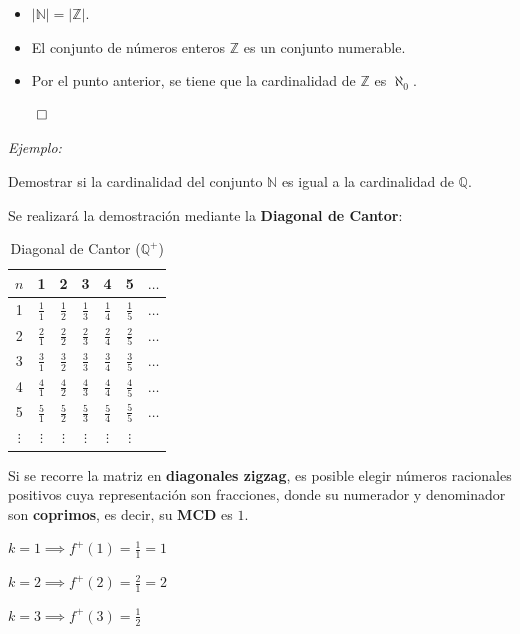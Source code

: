 \documentclass{article}
\begin{document}
\begin{itemize}
    \item $\left|\mathbb{N}\right| = \left|\mathbb{Z}\right|$.
    \item El conjunto de números enteros $\mathbb{Z}$ es un conjunto numerable.
    \item Por el punto anterior, se tiene que la cardinalidad de $\mathbb{Z}$ es $\aleph_0$.
\end{itemize}

$\qed$

\textit{Ejemplo:}

Demostrar si la cardinalidad del conjunto $\mathbb{N}$ es igual a la cardinalidad de $\mathbb{Q}$.

Se realizará la demostración mediante la \textbf{Diagonal de Cantor}:

\begin{table}[H]
\centering
\renewcommand{\arraystretch}{1.5}
\begin{tabular}{c|cccccc}
$n$ & 1 & 2 & 3 & 4 & 5 & $\dots$ \\ \hline
1 & \color{red}$\frac{1}{1}$ & $\frac{1}{2}$ & $\frac{1}{3}$ & $\frac{1}{4}$ & $\frac{1}{5}$ & $\dots$ \\
2 & $\frac{2}{1}$ & \color{red}$\frac{2}{2}$ & $\frac{2}{3}$ & $\frac{2}{4}$ & $\frac{2}{5}$ & $\dots$ \\
3 & $\frac{3}{1}$ & $\frac{3}{2}$ & \color{red}$\frac{3}{3}$ & $\frac{3}{4}$ & $\frac{3}{5}$ & $\dots$ \\
4 & $\frac{4}{1}$ & $\frac{4}{2}$ & $\frac{4}{3}$ & \color{red}$\frac{4}{4}$ & $\frac{4}{5}$ & $\dots$ \\
5 & $\frac{5}{1}$ & $\frac{5}{2}$ & $\frac{5}{3}$ & $\frac{5}{4}$ & \color{red}$\frac{5}{5}$ & $\dots$ \\
$\vdots$ & $\vdots$ & $\vdots$ & $\vdots$ & $\vdots$ & $\vdots$
\end{tabular}
\caption{Diagonal de Cantor ($\mathbb{Q}^+$)}
\end{table}

Si se recorre la matriz en \textbf{diagonales zigzag}, es posible elegir números racionales positivos cuya representación son fracciones, donde su numerador y denominador son \textbf{coprimos}, es decir, su \textbf{MCD} es $1$.
 
$k = 1 \implies f^+(1) = \frac{1}{1} = 1$

$k = 2 \implies f^+(2) = \frac{2}{1} = 2$

$k = 3 \implies f^+(3) = \frac{1}{2}$
\end{document}
